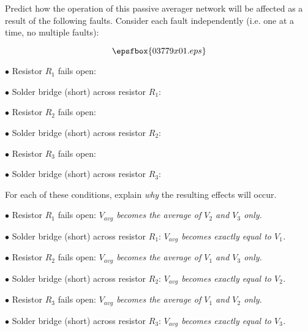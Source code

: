 

Predict how the operation of this passive averager network will be affected as a result of the following faults.  Consider each fault independently (i.e. one at a time, no multiple faults):

$$\epsfbox{03779x01.eps}$$

\medskip
\item{$\bullet$} Resistor $R_1$ fails open:
\vskip 5pt
\item{$\bullet$} Solder bridge (short) across resistor $R_1$:
\vskip 5pt
\item{$\bullet$} Resistor $R_2$ fails open:
\vskip 5pt
\item{$\bullet$} Solder bridge (short) across resistor $R_2$:
\vskip 5pt
\item{$\bullet$} Resistor $R_3$ fails open:
\vskip 5pt
\item{$\bullet$} Solder bridge (short) across resistor $R_3$:
\medskip

For each of these conditions, explain {\it why} the resulting effects will occur.







\medskip
\item{$\bullet$} Resistor $R_1$ fails open: {\it $V_{avg}$ becomes the average of $V_2$ and $V_3$ only.}
\vskip 5pt
\item{$\bullet$} Solder bridge (short) across resistor $R_1$: {\it $V_{avg}$ becomes exactly equal to $V_1$.}
\vskip 5pt
\item{$\bullet$} Resistor $R_2$ fails open: {\it $V_{avg}$ becomes the average of $V_1$ and $V_3$ only.}
\vskip 5pt
\item{$\bullet$} Solder bridge (short) across resistor $R_2$: {\it $V_{avg}$ becomes exactly equal to $V_2$.}
\vskip 5pt
\item{$\bullet$} Resistor $R_3$ fails open: {\it $V_{avg}$ becomes the average of $V_1$ and $V_2$ only.}
\vskip 5pt
\item{$\bullet$} Solder bridge (short) across resistor $R_3$: {\it $V_{avg}$ becomes exactly equal to $V_3$.}
\medskip






